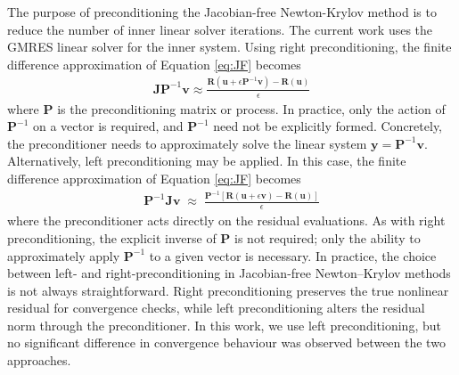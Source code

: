 \documentclass[sn-mathphys,Numbered]{sn-jnl}%
\newcommand{\bb}{\boldsymbol}
\begin{document}

The purpose of preconditioning the Jacobian-free Newton-Krylov method is to reduce the number of inner linear solver iterations.
The current work uses the GMRES linear solver for the inner system.
Using right preconditioning, the finite difference approximation of Equation \ref{eq:JF} becomes
\begin{eqnarray}
	\bb{J} \bb{P}^{-1} \bb{v}
	\approx
	\frac{\bb{R}(\bb{u} + \epsilon \bb{P}^{-1} \bb{v}) - \bb{R}(\bb{u})}{\epsilon}
\end{eqnarray}
where $\bb{P}$ is the preconditioning matrix or process.
In practice, only the action of $\bb{P}^{-1}$ on a vector is required, and $\bb{P}^{-1}$ need not be explicitly formed.
Concretely, the preconditioner needs to approximately solve the linear system $\bb{y} = \bb{P}^{-1} \bb{v}$.
Alternatively, left preconditioning may be applied. In this case, the finite difference approximation of Equation \ref{eq:JF} becomes
\begin{eqnarray}
	\bb{P}^{-1} \bb{J} \bb{v} \;\approx\; \frac{\bb{P}^{-1}\left[ \bb{R}(\bb{u}+\epsilon \bb{v}) - \bb{R}(\bb{u}) \right]}{\epsilon}
\end{eqnarray}
where the preconditioner acts directly on the residual evaluations. As with right preconditioning, the explicit inverse of $\bb{P}$ is not required; only the ability to approximately apply $\bb{P}^{-1}$ to a given vector is necessary.
In practice, the choice between left- and right-preconditioning in Jacobian-free Newton–Krylov methods is not always straightforward. Right preconditioning preserves the true nonlinear residual for convergence checks, while left preconditioning alters the residual norm through the preconditioner. In this work, we use left preconditioning, but no significant difference in convergence behaviour was observed between the two approaches.
\end{document}
